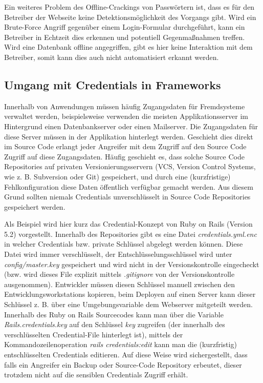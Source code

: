 Ein weiteres Problem des Offline-Crackings von Passwörtern ist, dass es für den Betreiber der Webseite keine Detektionsmöglichkeit des Vorgangs gibt. Wird ein Brute-Force Angriff gegenüber einem Login-Formular durchgeführt, kann ein Betreiber in Echtzeit dies erkennen und potentiell Gegenmaßnahmen treffen. Wird eine Datenbank offline angegriffen, gibt es hier keine Interaktion mit dem Betreiber, somit kann dies auch nicht automatisiert erkannt werden.

\subsection{Umgang mit Credentials in Frameworks}

Innerhalb von Anwendungen müssen häufig Zugangsdaten für Fremdsysteme verwaltet werden, beispielsweise verwenden die meisten Applikationsserver im Hintergrund einen Datenbankserver oder einen Mailserver. Die Zugangsdaten für diese Server müssen in der Applikation hinterlegt werden. Geschieht dies direkt im Source Code erlangt jeder Angreifer mit dem Zugriff auf den Source Code Zugriff auf diese Zugangsdaten. Häufig geschieht es, dass solche Source Code Repositories auf privaten Versionierungsservern (VCS, Version Control Systems, wie z. B. Subversion oder Git) gespeichert, und durch eine (kurzfristige) Fehlkonfiguration diese Daten öffentlich verfügbar gemacht werden. Aus diesem Grund sollten niemals Credentials unverschlüsselt in Source Code Repositories gespeichert werden.

Als Beispiel wird hier kurz das Credential-Konzept von Ruby on Rails (Version 5.2) vorgestellt. Innerhalb des Repositories gibt es eine Datei \textit{credentials.yml.enc} in welcher Credentials bzw. private Schlüssel abgelegt werden können. Diese Datei wird immer verschlüsselt, der Entschlüsselungsschlüssel wird unter \textit{config/master.key} gespeichert und wird nicht in der Versionskontrolle eingecheckt (bzw. wird dieses File explizit mittels \textit{.gitignore} von der Versionskontrolle ausgenommen). Entwickler müssen diesen Schlüssel manuell zwischen den Entwicklungsworkstations kopieren, beim Deployen auf einen Server kann dieser Schlüssel z. B. über eine Umgebungsvariable dem Webserver mitgeteilt werden. Innerhalb des Ruby on Rails Sourcecodes kann man über die Variable \textit{Rails.credentials.key} auf den Schlüssel \textit{key} zugreifen (der innerhalb des verschlüsselten Credential-File hinterlegt ist), mittels der Kommandozeilenoperation \textit{rails credentials:edit} kann man die (kurzfristig) entschlüsselten Credentials editieren. Auf diese Weise wird sichergestellt, dass falls ein Angreifer ein Backup oder Source-Code Repository erbeutet, dieser trotzdem nicht auf die sensiblen Credentials Zugriff erhält.

